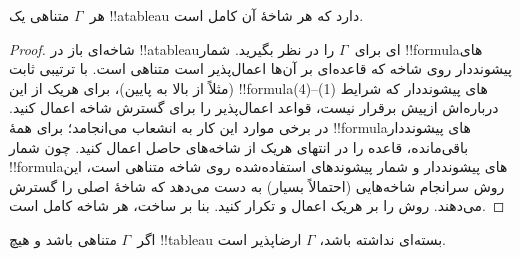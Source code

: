 \documentclass[../../../include/open-logic-section]{subfiles}
\begin{document}
\begin{prop}
  هر~$\Gamma$ متناهی یک !!a{tableau} دارد که هر شاخهٔ آن کامل است.
\end{prop}

\begin{proof}
  شاخه‌ای باز در !!a{tableau}ای برای~$\Gamma$ را در نظر بگیرید. شمار
  !!{formula}های پیشونددار روی شاخه که قاعده‌ای بر آن‌ها اعمال‌پذیر
  است متناهی است. با ترتیبی ثابت (مثلاً از بالا به پایین)، برای هریک از
  این !!{formula}های پیشونددار که شرایط (1)--(4) درباره‌اش ازپیش برقرار
  نیست، قواعد اعمال‌پذیر را برای گسترش شاخه اعمال کنید. در برخی موارد
  این کار به انشعاب می‌انجامد؛ برای همهٔ !!{formula}های پیشونددار
  باقی‌مانده، قاعده را در انتهای هریک از شاخه‌های حاصل اعمال کنید. چون
  شمار !!{formula}های پیشونددار و شمار پیشوندهای استفاده‌شده روی شاخه
  متناهی است، این روش سرانجام شاخه‌هایی (احتمالاً بسیار) به دست می‌دهد
  که شاخهٔ اصلی را گسترش می‌دهند. روش را بر هریک اعمال و تکرار کنید.
  بنا بر ساخت، هر شاخه کامل است.
\end{proof}

\begin{thm}[تمامیت]
  اگر~$\Gamma$ متناهی باشد و هیچ !!{tableau} بسته‌ای نداشته باشد،
  $\Gamma$ ارضاپذیر است.
\end{thm}
\end{document}
